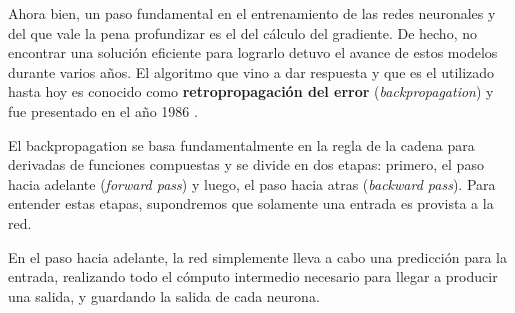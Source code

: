 \documentclass[../../main.tex]{subfiles}
\begin{document}
Ahora bien, un paso fundamental en el entrenamiento de las redes neuronales y del que vale
la pena profundizar es el del cálculo del gradiente. De hecho, no encontrar una solución
eficiente para lograrlo detuvo el avance de estos modelos durante varios años. El
algoritmo que vino a dar respuesta y que es el utilizado hasta hoy es conocido como
\textbf{retropropagación del error} (\textit{backpropagation}) y fue presentado en el año
1986 \cite{backprop-1986}.

El backpropagation se basa fundamentalmente en la regla de la cadena para derivadas de
funciones compuestas y se divide en dos etapas: primero, el paso hacia adelante
(\textit{forward pass}) y luego, el paso hacia atras (\textit{backward pass}). Para
entender estas etapas, supondremos que solamente una entrada es provista a la red.

En el paso hacia adelante, la red simplemente lleva a cabo una predicción para la entrada,
realizando todo el cómputo intermedio necesario para llegar a producir una salida, y
guardando la salida de cada neurona.
\end{document}
